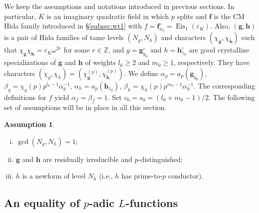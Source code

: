 \documentclass[a4paper,11pt]{amsart}
\theoremstyle{plain}
\theoremstyle{definition}
\newtheorem{ass}[theorem]{Assumption}
\theoremstyle{remark}
\newcommand{\bb}{\mathbb}
\DeclareMathOperator{\Eis}{Eis}
\newcommand{\ord}{{\mathrm{ord}}}
\newcommand{\hf}{{\mathbf{f}}}
\newcommand{\hg}{{\mathbf{g}}}
\newcommand{\hh}{{\mathbf h}}
\numberwithin{equation}{section}
\begin{document}
We keep the assumptions and notations introduced in previous sections. In particular, $K$ is an imaginary quadratic field in which $p$ splits and $\hf$ is the CM Hida family introduced in \S\ref{subsec:wt1} with $f=\hf_{x_0}^\circ=\Eis_1(\varepsilon_K)$. Also, $(\hg,\hh)$ is a pair of Hida families of tame levels $(N_g,N_h)$ and characters $(\chi_\hg,\chi_\hh)$ such that $\chi_\hg \chi_\hh =\varepsilon_K \omega^{2r}$ for some $r\in \bb{Z}$, and $g=\hg_{y_0}^\circ$ and $h=\hh_{z_0}^\circ$ are good crystalline specializations of $\hg$ and $\hh$ of weights $l_0\geq 2$ and $m_0\geq 1$, respectively. They have characters $(\chi_g,\chi_h)=(\chi_{\hg}^{(p)},\chi_\hh^{(p)})$. We define $\alpha_g=a_p(\hg_{y_0})$, $\beta_g=\chi_g(p)p^{l_0-1}\alpha_g^{-1}$, $\alpha_h=a_p(\hh_{z_0})$, $\beta_h=\chi_h(p)p^{m_0-1}\alpha_h^{-1}$. The corresponding definitions for $f$ yield $\alpha_f=\beta_f=1$. Set $c_0=s_0=(l_0+m_0-1)/2$. The following set of assumptions will be in place in all this section.

\begin{ass}
\hfill
\begin{enumerate}[(i)]
    \item $\gcd(N_g,N_h)=1$;
    \item $\hg$ and $\hh$ are residually irreducible and $p$-distinguished;
    \item $h$ is a newform of level $N_h$ (i.e., $h$ has prime-to-$p$ conductor).
\end{enumerate}
\end{ass}






\subsection{An equality of $p$-adic $L$-functions}
\end{document}
